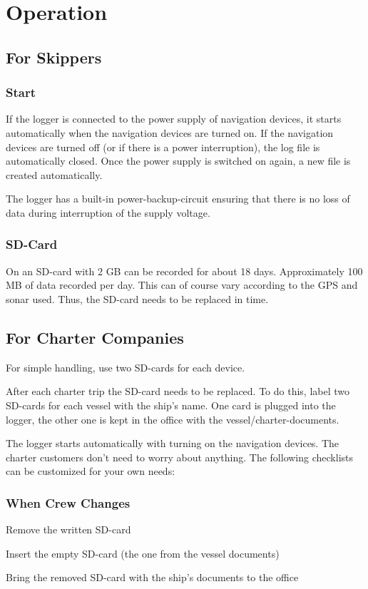 \documentclass[pdftex, 8pt, paper=130mm:92mm,pagesize]{scrartcl}
\let\stdsection\section
\renewcommand\section{\newpage\stdsection}
\begin{document}
\section{Operation}

\subsection{For Skippers}

\subsubsection{Start}

If the logger is connected to the power supply of navigation devices, it starts automatically when the navigation devices are turned on. If the navigation devices are turned off (or if there is a power interruption), the log file is automatically closed. Once the power supply is switched on again, a new file is created automatically. 

The logger has a built-in power-backup-circuit ensuring that there is no loss of data during interruption of the supply voltage.
\newpage
\subsubsection{SD-Card}

On an SD-card with 2 GB can be recorded for about 18 days. Approximately 100 MB of data recorded per day. This can of course vary according to the GPS and sonar used. Thus, the SD-card needs to be replaced in time. 

\subsection{For Charter Companies}

For simple handling, use two SD-cards for each device. 

After each charter trip the SD-card needs to be replaced. To do this, label two SD-cards for each vessel with the ship's name. One card is plugged into the logger, the other one is kept in the office with the vessel/charter-documents.

The logger starts automatically with turning on the navigation devices. The charter customers don't need to worry about anything. The following checklists can be customized for your own needs:  

\subsubsection{When Crew Changes} 
\begin{compactenum}
\item Remove the written SD-card 
\item Insert the empty SD-card (the one from the vessel documents)
\item Bring the removed SD-card with the ship's documents to the office 
\end{compactenum}
\end{document}
